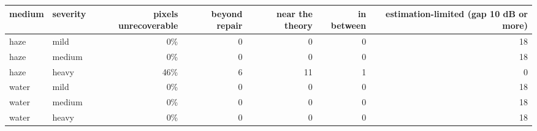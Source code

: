 \begin{tabular}{llrrrrr}
\toprule
medium & severity & pixels unrecoverable & beyond repair & near the theory & in between & estimation-limited (gap 10 dB or more) \\
\midrule
haze & mild & 0\% & 0 & 0 & 0 & 18 \\
haze & medium & 0\% & 0 & 0 & 0 & 18 \\
haze & heavy & 46\% & 6 & 11 & 1 & 0 \\
water & mild & 0\% & 0 & 0 & 0 & 18 \\
water & medium & 0\% & 0 & 0 & 0 & 18 \\
water & heavy & 0\% & 0 & 0 & 0 & 18 \\
\bottomrule
\end{tabular}
